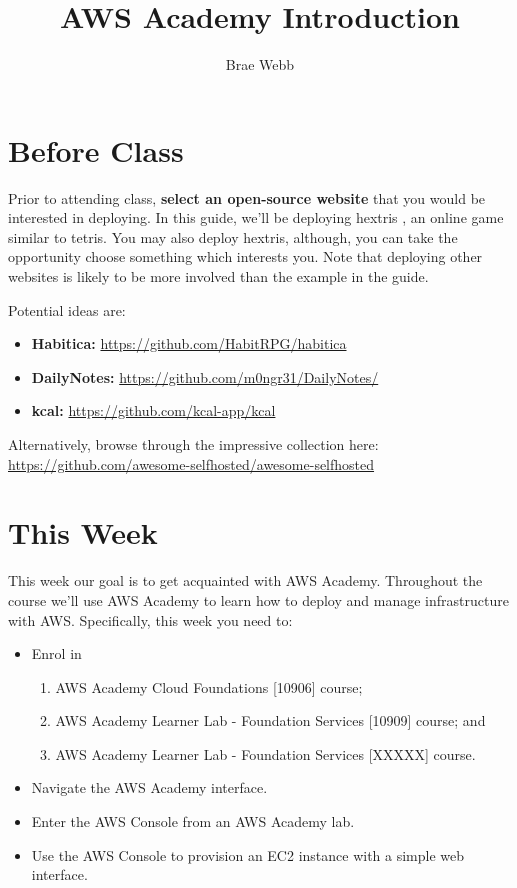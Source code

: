 \documentclass{csse4400}
\title{AWS Academy Introduction}
\author{Brae Webb}
\date{\week{1}}
\begin{document}
\maketitle

\section{Before Class}
Prior to attending class, \textbf{select an open-source website} that you would be interested in deploying.
In this guide, we'll be deploying hextris \cite{hextris}, an online game similar to tetris.
You may also deploy hextris, although,
you can take the opportunity choose something which interests you.
Note that deploying other websites is likely to be more involved than the example in the guide.

Potential ideas are:
\begin{itemize}
    \item \textbf{Habitica:} \url{https://github.com/HabitRPG/habitica}
    \item \textbf{DailyNotes:} \url{https://github.com/m0ngr31/DailyNotes/}
    \item \textbf{kcal:} \url{https://github.com/kcal-app/kcal} 
\end{itemize}

\noindent Alternatively, browse through the impressive collection here:\\ \url{https://github.com/awesome-selfhosted/awesome-selfhosted}

\section{This Week}
This week our goal is to get acquainted with AWS Academy.
Throughout the course we'll use AWS Academy to learn how to deploy and manage infrastructure with AWS.
Specifically, this week you need to:
\begin{itemize}
    \item Enrol in
    \begin{enumerate}
        \item AWS Academy Cloud Foundations [10906] course;
        \item AWS Academy Learner Lab - Foundation Services [10909] course; and
        \item AWS Academy Learner Lab - Foundation Services [XXXXX] course. 
    \end{enumerate}
    \item Navigate the AWS Academy interface.
    \item Enter the AWS Console from an AWS Academy lab.
    \item Use the AWS Console to provision an EC2 instance with a simple web interface.
\end{itemize}
\end{document}
